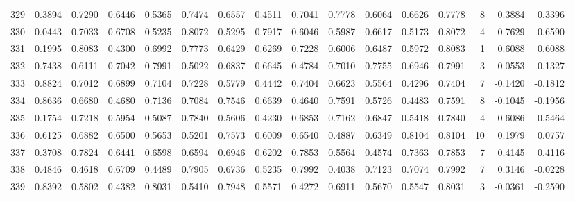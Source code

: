 \begin{tabular}{lrrrrrrrrrrrrrrr}
329 &      0.3894 &  0.7290 &  0.6446 &  0.5365 &  0.7474 &  0.6557 &  0.4511 &  0.7041 &  0.7778 &  0.6064 &   0.6626 &     0.7778 &      8 &                    0.3884 &                     0.3396 \\
330 &      0.0443 &  0.7033 &  0.6708 &  0.5235 &  0.8072 &  0.5295 &  0.7917 &  0.6046 &  0.5987 &  0.6617 &   0.5173 &     0.8072 &      4 &                    0.7629 &                     0.6590 \\
331 &      0.1995 &  0.8083 &  0.4300 &  0.6992 &  0.7773 &  0.6429 &  0.6269 &  0.7228 &  0.6006 &  0.6487 &   0.5972 &     0.8083 &      1 &                    0.6088 &                     0.6088 \\
332 &      0.7438 &  0.6111 &  0.7042 &  0.7991 &  0.5022 &  0.6837 &  0.6645 &  0.4784 &  0.7010 &  0.7755 &   0.6946 &     0.7991 &      3 &                    0.0553 &                    -0.1327 \\
333 &      0.8824 &  0.7012 &  0.6899 &  0.7104 &  0.7228 &  0.5779 &  0.4442 &  0.7404 &  0.6623 &  0.5564 &   0.4296 &     0.7404 &      7 &                   -0.1420 &                    -0.1812 \\
334 &      0.8636 &  0.6680 &  0.4680 &  0.7136 &  0.7084 &  0.7546 &  0.6639 &  0.4640 &  0.7591 &  0.5726 &   0.4483 &     0.7591 &      8 &                   -0.1045 &                    -0.1956 \\
335 &      0.1754 &  0.7218 &  0.5954 &  0.5087 &  0.7840 &  0.5606 &  0.4230 &  0.6853 &  0.7162 &  0.6847 &   0.5418 &     0.7840 &      4 &                    0.6086 &                     0.5464 \\
336 &      0.6125 &  0.6882 &  0.6500 &  0.5653 &  0.5201 &  0.7573 &  0.6009 &  0.6540 &  0.4887 &  0.6349 &   0.8104 &     0.8104 &     10 &                    0.1979 &                     0.0757 \\
337 &      0.3708 &  0.7824 &  0.6441 &  0.6598 &  0.6594 &  0.6946 &  0.6202 &  0.7853 &  0.5564 &  0.4574 &   0.7363 &     0.7853 &      7 &                    0.4145 &                     0.4116 \\
338 &      0.4846 &  0.4618 &  0.6709 &  0.4489 &  0.7905 &  0.6736 &  0.5235 &  0.7992 &  0.4038 &  0.7123 &   0.7074 &     0.7992 &      7 &                    0.3146 &                    -0.0228 \\
339 &      0.8392 &  0.5802 &  0.4382 &  0.8031 &  0.5410 &  0.7948 &  0.5571 &  0.4272 &  0.6911 &  0.5670 &   0.5547 &     0.8031 &      3 &                   -0.0361 &                    -0.2590 \\

\end{tabular}
